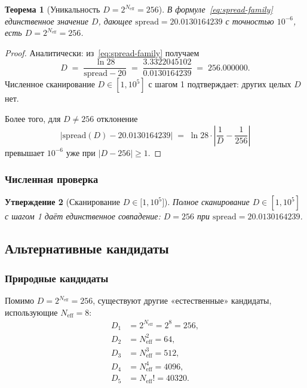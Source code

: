 \documentclass[11pt,a4paper]{article}
\newtheorem{theorem}{Теорема}[section]
\newtheorem{proposition}[theorem]{Утверждение}
\theoremstyle{definition}
\begin{document}
\begin{theorem}[Уникальность $D = 2^{N_{\text{eff}}} = 256$]
\label{thm:uniqueness-d}
В формуле~\eqref{eq:spread-family} единственное значение $D$,
дающее $\text{spread} = 20.0130164239$ с точностью $10^{-6}$,
есть $D = 2^{N_{\text{eff}}} = 256$.
\end{theorem}

\begin{proof}
Аналитически: из~\eqref{eq:spread-family} получаем
\begin{equation}
    D \;=\; \frac{\ln 28}{\text{spread} - 20}
    \;=\; \frac{3.3322045102}{0.0130164239}
    \;=\; 256.000000.
\end{equation}
Численное сканирование $D \in [1, 10^5]$ с шагом 1
подтверждает: других целых $D$ нет.

Более того, для $D \neq 256$ отклонение
\begin{equation}
    |\text{spread}(D) - 20.0130164239|
    \;=\; \ln 28 \cdot
    \left| \frac{1}{D} - \frac{1}{256} \right|
\end{equation}
превышает $10^{-6}$ уже при $|D - 256| \geq 1$.
\end{proof}

\subsubsection{Численная проверка}

\begin{proposition}[Сканирование $D \in \lbrack 1, 10^5 \rbrack$]
\label{prop:scan-d}
Полное сканирование $D \in [1, 10^5]$ с шагом 1 даёт
единственное совпадение: $D = 256$ при $\text{spread} = 20.0130164239$.
\end{proposition}

\subsection{Альтернативные кандидаты}
\label{subsec:spread-candidates}

\subsubsection{Природные кандидаты}

Помимо $D = 2^{N_{\text{eff}}} = 256$, существуют другие
«естественные» кандидаты, использующие $N_{\text{eff}} = 8$:
\begin{align}
    D_1 &= 2^{N_{\text{eff}}} = 2^8 = 256, \\
    D_2 &= N_{\text{eff}}^2 = 64, \\
    D_3 &= N_{\text{eff}}^3 = 512, \\
    D_4 &= N_{\text{eff}}^4 = 4096, \\
    D_5 &= N_{\text{eff}}! = 40320.
\end{align}
\end{document}
